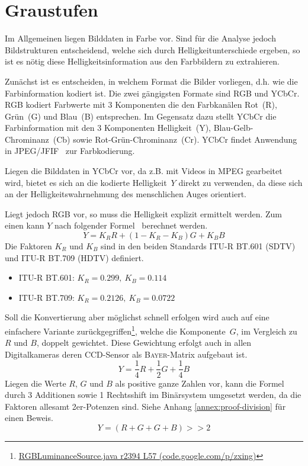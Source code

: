 \section{Graustufen}
\label{sec:grayscale}
\writtenby{\dcauthornameewie}%
Im Allgemeinen liegen Bilddaten in Farbe vor.
Sind für die Analyse jedoch Bildstrukturen entscheidend, welche sich durch Helligkeitunterschiede ergeben, so ist es nötig diese Helligkeitsinformation aus den Farbbildern zu extrahieren.

Zunächst ist es entscheiden, in welchem Format die Bilder vorliegen, d.h. wie die Farbinformation kodiert ist.
Die zwei gängigsten Formate sind RGB und YCbCr.
RGB kodiert Farbwerte mit 3 Komponenten die den Farbkanälen Rot~(R), Grün~(G) und Blau~(B) entsprechen.
Im Gegensatz dazu stellt YCbCr die Farbinformation mit den 3 Komponenten Helligkeit~(Y), Blau-Gelb-Chrominanz~(Cb) sowie Rot-Grün-Chrominanz~(Cr).
YCbCr findet Anwendung in JPEG/JFIF~\cite{jfif} zur Farbkodierung.

Liegen die Bilddaten in YCbCr vor, da z.B. mit Videos in MPEG gearbeitet wird, bietet es sich an die kodierte Helligkeit~$Y$ direkt zu verwenden, da diese sich an der Helligkeitswahrnehmung des menschlichen Auges orientiert.

Liegt jedoch RGB vor, so muss die Helligkeit explizit ermittelt werden.
Zum einen kann $Y$ nach folgender Formel~\cite[2.5.1]{itu/rec/601} berechnet werden.
\begin{equation}
  Y = K_R R + (1 - K_R - K_B) G + K_B B
\end{equation}
Die Faktoren $K_R$ und $K_B$ sind in den beiden Standards ITU-R BT.601 (SDTV) und ITU-R BT.709 (HDTV) definiert.
%
\begin{itemize}
\item ITU-R BT.601: $K_R=0.299,~K_B=0.114$ \cite[2.5.1]{itu/rec/601}
\item ITU-R BT.709: $K_R=0.2126,~K_B=0.0722$ \cite[4]{itu/rec/709}
\end{itemize}
%
Soll die Konvertierung aber möglichst schnell erfolgen wird auch auf eine einfachere Variante zurückgegriffen\footnote{\href{https://code.google.com/p/zxing/source/browse/trunk/core/src/com/google/zxing/RGBLuminanceSource.java?spec=svn2633&r=2394\#57}{RGBLuminanceSource.java r2394 L57 (code.google.com/p/zxing)}}, welche die Komponente~$G$, im Vergleich zu $R$ und $B$, doppelt gewichtet.
Diese Gewichtung erfolgt auch in allen Digitalkameras deren CCD-Sensor als \textsc{Bayer}-Matrix aufgebaut ist.
\begin{equation}
  Y = \frac{1}{4} R + \frac{1}{2} G + \frac{1}{4}B
\end{equation}
Liegen die Werte $R$, $G$ und $B$ als positive ganze Zahlen vor, kann die Formel durch 3 Additionen sowie 1 Rechtsshift im Binärsystem umgesetzt werden, da die Faktoren allesamt 2er-Potenzen sind.
Siehe Anhang \ref{annex:proof-division} für einen Beweis.
\begin{equation}
  Y = (R + G + G + B) >\!\!> 2
\end{equation}
